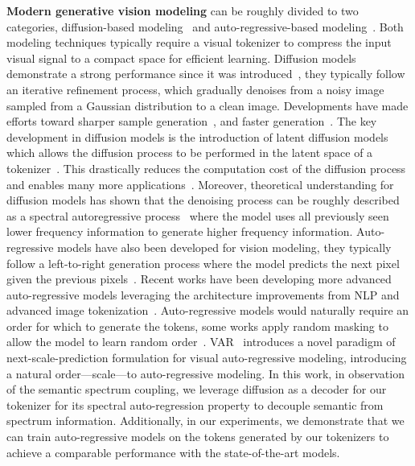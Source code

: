 \documentclass[10pt,twocolumn,letterpaper]{article}
\begin{document}
\noindent \textbf{Modern generative vision modeling}
can be roughly divided to two categories, diffusion-based modeling~\cite{dit} and auto-regressive-based modeling~\cite{llamagen}. 
Both modeling techniques typically require a visual tokenizer to compress the input visual signal to a compact space for efficient learning.
Diffusion models demonstrate a strong performance since it was introduced~\cite{DDPM}, they typically follow an iterative refinement process, which gradually denoises from a noisy image sampled from a Gaussian distribution to a clean image.
Developments have made efforts toward sharper sample generation~\cite{DDPM,dhariwal2021diffusion}, and faster generation~\cite{ddim}.
The key development in diffusion models is the introduction of latent diffusion models~\cite{LDM} which allows the diffusion process to be performed in the latent space of a tokenizer~\cite{VQGAN}.
This drastically reduces the computation cost of the diffusion process and enables many more applications~\cite{dit,dalle2}.
Moreover, theoretical understanding for diffusion models has shown that the denoising process can be roughly described as a spectral autoregressive process~\cite{diffusion_is_spectral_ar,rissanen2022generative} where the model uses all previously seen lower frequency information to generate higher frequency information.
Auto-regressive models have also been developed for vision modeling, they typically follow a left-to-right generation process where the model predicts the next pixel given the previous pixels~\cite{pixelcnn,pixelrnn}.
Recent works have been developing more advanced auto-regressive models leveraging the architecture improvements from NLP and advanced image tokenization~\cite{llamagen}.
Auto-regressive models would naturally require an order for which to generate the tokens, some works apply random masking to allow the model to learn random order~\cite{RAR,mar,maskgit}.
VAR~\cite{var} introduces a novel paradigm of next-scale-prediction formulation for visual auto-regressive modeling, introducing a natural order---scale---to auto-regressive modeling.
In this work, in observation of the semantic spectrum coupling, we leverage diffusion as a decoder for our tokenizer for its spectral auto-regression property to decouple semantic from spectrum information.
Additionally, in our experiments, we demonstrate that we can train auto-regressive models on the tokens generated by our tokenizers to achieve a comparable performance with the state-of-the-art models.
\end{document}
